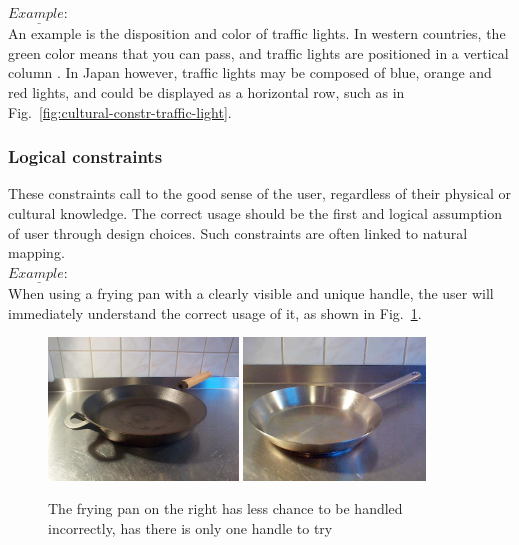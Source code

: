 \documentclass[a4paper,11pt] {article}
\theoremstyle{definition}
\begin{document}
        $\underline{Example:}$\\
        An example is the disposition and color of traffic lights. In western countries, the green color means that you can pass, and traffic lights are positioned in a vertical column . In Japan however, traffic lights may be composed of blue, orange and red lights, and could be displayed as a horizontal row, such as in Fig.~\ref{fig:cultural-constr-traffic-light}.

        \subsubsection{Logical constraints}
        These constraints call to the good sense of the user, regardless of their physical or cultural knowledge. The correct usage should be the first and logical assumption of user through design choices. Such constraints are often linked to natural mapping.\\

        $\underline{Example:}$\\
        When using a frying pan with a clearly visible and unique handle, the user will immediately understand the correct usage of it, as shown in Fig.~\ref{fig:log-constr-fryingpan}.

        \begin{figure}[h]
        \centering
        \includegraphics[width=0.45\textwidth]{fig-report/frying-pan-2handles.jpg}
        \includegraphics[width=0.43\textwidth]{fig-report/frying-pan-1handle.jpg}
        \caption{The frying pan on the right has less chance to be handled incorrectly, has there is only one handle to try}
        \label{fig:log-constr-fryingpan}
        \end{figure}
\end{document}
